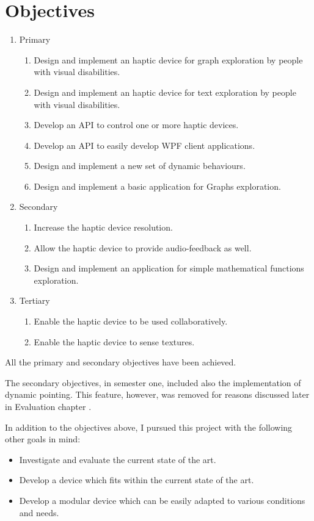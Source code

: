 \chapter{Objectives}


\begin{enumerate}
	\item Primary
    \begin{enumerate}
    	\item Design and implement an haptic device for graph exploration by people with visual disabilities.
        \item Design and implement an haptic device for text exploration by people with visual disabilities.
        \item Develop an API to control one or more haptic devices.
        \item Develop an API to easily develop WPF client applications.
        \item Design and implement a new set of dynamic behaviours.
        \item Design and implement a basic application for Graphs exploration.
    \end{enumerate}
    \item Secondary
    \begin{enumerate}
        \item Increase the haptic device resolution.
        \item Allow the haptic device to provide audio-feedback as well.
        \item Design and implement an application for simple mathematical functions exploration.
    \end{enumerate}
    \item Tertiary
    \begin{enumerate}
    	\item Enable the haptic device to be used collaboratively.
        \item Enable the haptic device to sense textures.
    \end{enumerate}
\end{enumerate}

All the primary and secondary objectives have been achieved.\par
The secondary objectives, in semester one, included also the implementation of dynamic pointing. This feature, however, was removed for reasons discussed later in Evaluation chapter .

In addition to the objectives above, I pursued this project with the following other goals in mind:
\begin{itemize}
	\item Investigate and evaluate the current state of the art.
    \item Develop a device which fits within the current state of the art.
    \item Develop a modular device which can be easily adapted to various conditions and needs.
\end{itemize}